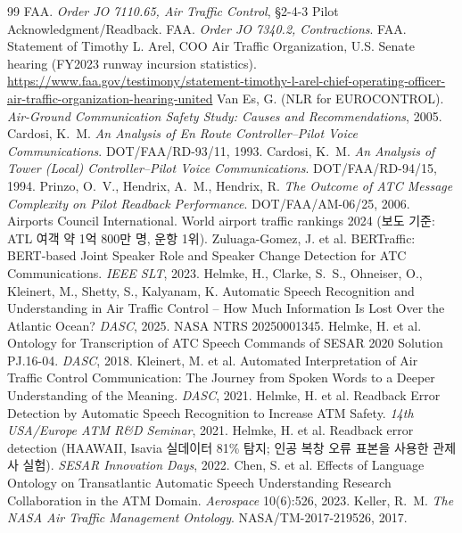 \documentclass[10pt,a4paper]{article}
\begin{document}
\begin{thebibliography}{99}\small
{} FAA. \emph{Order JO 7110.65, Air Traffic Control}, §2-4-3 Pilot Acknowledgment/Readback.
 FAA. \emph{Order JO 7340.2, Contractions}.
 FAA. Statement of Timothy L. Arel, COO Air Traffic Organization, U.S. Senate hearing (FY2023 runway incursion statistics). \url{https://www.faa.gov/testimony/statement-timothy-l-arel-chief-operating-officer-air-traffic-organization-hearing-united}
 Van Es, G. (NLR for EUROCONTROL). \emph{Air-Ground Communication Safety Study: Causes and Recommendations}, 2005.
 Cardosi, K.~M. \emph{An Analysis of En Route Controller--Pilot Voice Communications}. DOT/FAA/RD-93/11, 1993.
 Cardosi, K.~M. \emph{An Analysis of Tower (Local) Controller--Pilot Voice Communications}. DOT/FAA/RD-94/15, 1994.
 Prinzo, O.~V., Hendrix, A.~M., Hendrix, R. \emph{The Outcome of ATC Message Complexity on Pilot Readback Performance}. DOT/FAA/AM-06/25, 2006.
 Airports Council International. World airport traffic rankings 2024 (보도 기준: ATL 여객 약 1억 800만 명, 운항 1위).
 Zuluaga-Gomez, J. et al. BERTraffic: BERT-based Joint Speaker Role and Speaker Change Detection for ATC Communications. \emph{IEEE SLT}, 2023.
 Helmke, H., Clarke, S.~S., Ohneiser, O., Kleinert, M., Shetty, S., Kalyanam, K. Automatic Speech Recognition and Understanding in Air Traffic Control -- How Much Information Is Lost Over the Atlantic Ocean? \emph{DASC}, 2025. NASA NTRS 20250001345.
 Helmke, H. et al. Ontology for Transcription of ATC Speech Commands of SESAR 2020 Solution PJ.16-04. \emph{DASC}, 2018.
 Kleinert, M. et al. Automated Interpretation of Air Traffic Control Communication: The Journey from Spoken Words to a Deeper Understanding of the Meaning. \emph{DASC}, 2021.
 Helmke, H. et al. Readback Error Detection by Automatic Speech Recognition to Increase ATM Safety. \emph{14th USA/Europe ATM R\&D Seminar}, 2021.
 Helmke, H. et al. Readback error detection (HAAWAII, Isavia 실데이터 81\% 탐지; 인공 복창 오류 표본을 사용한 관제사 실험). \emph{SESAR Innovation Days}, 2022.
 Chen, S. et al. Effects of Language Ontology on Transatlantic Automatic Speech Understanding Research Collaboration in the ATM Domain. \emph{Aerospace} 10(6):526, 2023.
 Keller, R.~M. \emph{The NASA Air Traffic Management Ontology}. NASA/TM-2017-219526, 2017.

\end{thebibliography}
\end{document}
